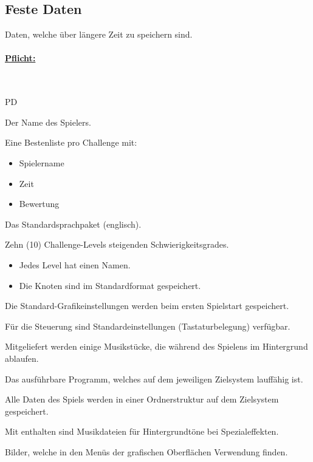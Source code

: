%
%


\subsection{Feste Daten}
\label{PD:persDat}

Daten, welche über längere Zeit zu speichern sind.\\


%
%
\paragraph*{\underline{Pflicht:}}~\\


\begin{ids}{\gls{PD}}

	\id[ 10] Der Name des Spielers.
	
	\id[ 20] Eine Bestenliste pro Challenge mit:
	
		\begin{itemize}
		
			\item Spielername
			\item Zeit
			\item Bewertung
			
		\end{itemize}
	
	\id[ 30] Das Standardsprachpaket (englisch).
	
	\id[ 40] Zehn (10) Challenge-Levels steigenden Schwierigkeitsgrades.
	
	\begin{itemize}
	
		\item Jedes Level hat einen Namen.
		\item Die Knoten sind im Standardformat gespeichert.
		
	\end{itemize}
	
	\id[ 50] Die Standard-Grafikeinstellungen werden beim ersten Spielstart gespeichert.
	
	\id[ 60] Für die Steuerung sind Standardeinstellungen (Tastaturbelegung) verfügbar.
	
	\id[ 70] Mitgeliefert werden einige Musikstücke, die während des Spielens im Hintergrund ablaufen.
	
	\id[ 80] Das ausführbare Programm, welches auf dem jeweiligen Zielsystem lauffähig ist.
	
	\id[ 90] Alle Daten des Spiels werden in einer Ordnerstruktur auf dem Zielsystem gespeichert.
	
	\id[100] Mit enthalten sind Musikdateien für Hintergrundtöne bei Spezialeffekten.
	
	\id[110] Bilder, welche in den Menüs der grafischen Oberflächen Verwendung finden.
	
\end{ids}


